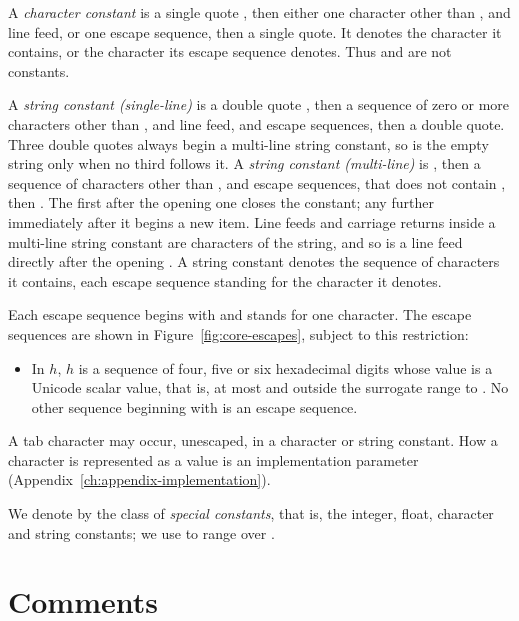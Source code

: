 A \emph{character constant} is a single quote \kw{\textquotesingle}, then
either one character other than \kw{\textquotesingle}, \kw{\textbackslash} and
line feed, or one escape sequence, then a single quote. It denotes the
character it contains, or the character its escape sequence denotes. Thus
\kw{\textquotesingle\textquotesingle} and
 are not constants.

A \emph{string constant (single-line)} is a double quote , then a
sequence of zero or more characters other than , \kw{\textbackslash} and
line feed, and escape sequences, then a double quote. Three double quotes
 always begin a multi-line string constant, so  is the empty
string only when no third  follows it. A \emph{string constant
(multi-line)} is , then a sequence of characters other than
\kw{\textbackslash}, and escape sequences, that does not contain , then
. The first  after the opening one closes the constant; any
further  immediately after it begins a new item.
Line feeds and carriage returns inside a multi-line string constant are
characters of the string, and so is a line feed directly after the opening
. A string constant denotes the sequence of characters it contains,
each escape sequence standing for the character it denotes.

Each escape sequence begins with \kw{\textbackslash} and stands for one
character. The escape sequences are shown in Figure~\ref{fig:core-escapes},
subject to this restriction:
\begin{itemize}
\item{} In $h$\kw{\kwrb}, $h$ is a sequence of four, five or
  six hexadecimal digits whose value is a Unicode scalar value, that is, at most
   and outside the surrogate range  to . No other
  sequence beginning with \kw{\textbackslash} is an escape sequence.
\end{itemize}
A tab character may occur, unescaped, in a character or string constant. How a
character is represented as a value is an implementation parameter
(Appendix~\ref{ch:appendix-implementation}).


We denote by  the class of \emph{special constants}, that is, the
integer, float, character and string constants; we use \scon{} to range over
.

\section{Comments}

